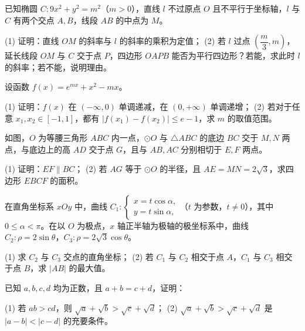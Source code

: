\begin{question}
已知椭圆 $C:9x^2+y^2=m^2$（$m>0$），直线 $l$ 不过原点 $O$ 且不平行于坐标轴，$l$ 与 $C$ 有两个交点 $A,B$，线段 $AB$ 的中点为 $M$。

(1) 证明：直线 $OM$ 的斜率与 $l$ 的斜率的乘积为定值；  
(2) 若 $l$ 过点 $\left(\dfrac m3,m\right)$，延长线段 $OM$ 与 $C$ 交于点 $P$，四边形 $OAPB$ 能否为平行四边形？若能，求此时 $l$ 的斜率；若不能，说明理由。

\end{question}
\begin{question}
设函数 $f(x)=e^{mx}+x^2-mx$。

(1) 证明：$f(x)$ 在 $(-\infty,0)$ 单调递减，在 $(0,+\infty)$ 单调递增；  
(2) 若对于任意 $x_1,x_2\in[-1,1]$，都有 $|f(x_1)-f(x_2)|\leqslant e-1$，求 $m$ 的取值范围。

\Needspace{0.4\textheight}
\end{question}
\begin{question}
如图，$O$ 为等腰三角形 $ABC$ 内一点，$\odot O$ 与 $\triangle ABC$ 的底边 $BC$ 交于 $M,N$ 两点，与底边上的高 $AD$ 交于点 $G$，且与 $AB,AC$ 分别相切于 $E,F$ 两点。

(1) 证明：$EF\parallel BC$；  
(2) 若 $AG$ 等于 $\odot O$ 的半径，且 $AE=MN=2\sqrt3$，求四边形 $EBCF$ 的面积。
\nopagebreak[4]
\begin{center}\end{center}
\nopagebreak[4]
\end{question}
\begin{question}
在直角坐标系 $xOy$ 中，曲线 $C_1:\begin{cases}x=t\cos\alpha,\\y=t\sin\alpha,\end{cases}$（$t$ 为参数，$t\ne0$），其中 $0\leqslant\alpha<\pi$。在以 $O$ 为极点，$x$ 轴正半轴为极轴的极坐标系中，曲线 $C_2:\rho=2\sin\theta$，$C_3:\rho=2\sqrt3\cos\theta$。

(1) 求 $C_2$ 与 $C_3$ 交点的直角坐标；  
(2) 若 $C_1$ 与 $C_2$ 相交于点 $A$，$C_1$ 与 $C_3$ 相交于点 $B$，求 $|AB|$ 的最大值。

\end{question}
\begin{question}
已知 $a,b,c,d$ 均为正数，且 $a+b=c+d$，证明：

(1) 若 $ab>cd$，则 $\sqrt a+\sqrt b>\sqrt c+\sqrt d$；  
(2) $\sqrt a+\sqrt b>\sqrt c+\sqrt d$ 是 $|a-b|<|c-d|$ 的充要条件。

\end{question}